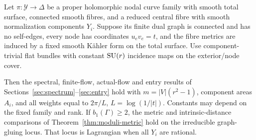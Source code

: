 \begin{proposition}\label{prop:fixed-graph-extension}
Let $\pi:\mathcal Y\to\Delta$ be a proper holomorphic
nodal curve family with smooth total surface,
connected smooth fibres, and a reduced central
fibre with smooth normalization components $Y_i$.
Suppose its finite dual graph is connected and
has no self-edges, every node has coordinates
$u_ev_e=t$, and the fibre metrics are induced
by a fixed smooth Kähler form on the total surface.
Use component-trivial flat bundles with constant
$\operatorname{SU}(r)$ incidence maps on the exterior/node cover.

Then the spectral, finite-flow, actual-flow and
entry results of Sections~\ref{sec:spectrum}--\ref{sec:entry}
hold with $m=|V|(r^2-1)$, component areas $A_i$,
and all weights equal to $2\pi/L$,
$L=\log(1/|t|)$. Constants may depend on the
fixed family and rank. If $b_1(\Gamma)\ge2$,
the metric and intrinsic-distance comparisons
of Theorem~\ref{thm:moduli-metric} hold on the
irreducible graph-gluing locus. That locus is
Lagrangian when all $Y_i$ are rational.
\end{proposition}
